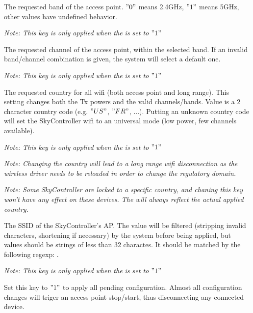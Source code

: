 
The requested band of the access point. $"0"$ means 2.4GHz, $"1"$ means 5GHz, other values have undefined behavior.

\emph{Note: This key is only applied when the  is set to $"1"$}


The requested channel of the access point, within the selected band. If an invalid band/channel combination is given, the system will select a default one.

\emph{Note: This key is only applied when the  is set to $"1"$}


The requested country for all wifi (both access point and long range). This setting changes both the Tx powers and the valid channels/bands. Value is a 2 character country code (e.g. $"US"$, $"FR"$, ...). Putting an unknown country code will set the SkyController wifi to an universal mode (low power, few channels available).

\emph{Note: This key is only applied when the  is set to $"1"$}

\emph{Note: Changing the country will lead to a long range wifi disconnection as the wireless driver needs to be reloaded in order to change the regulatory domain.}

\emph{Note: Some SkyController are locked to a specific country, and chaning this key won't have any effect on these devices. The  will always reflect the actual applied country.}


The SSID of the SkyController's AP. The value will be filtered (stripping invalid characters, shortening if necessary) by the system before being applied, but values should be strings of less than 32 charactes. It should be matched by the following regexp: .

\emph{Note: This key is only applied when the  is set to $"1"$}


Set this key to $"1"$ to apply all pending  configuration. Almost all configuration changes will triger an access point stop/start, thus disconnecting any connected device.


